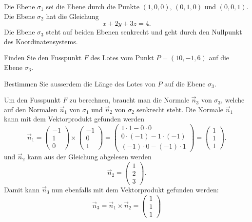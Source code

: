 Die Ebene $\sigma_1$ sei die Ebene durch die Punkte $(1,0,0)$,
$(0,1,0)$ und $(0,0,1)$.
Die Ebene $\sigma_2$ hat die Gleichung
\[
x+2y+3z=4.
\]
Die Ebene $\sigma_3$ steht auf beiden Ebenen senkrecht und geht
durch den Nullpunkt des Koordinatensystems.
\begin{teilaufgaben}
\item
Finden Sie den Fusspunkt $F$ des Lotes vom Punkt $P=(10,-1,6)$ auf die
Ebene $\sigma_3$.
\item
Bestimmen Sie ausserdem die Länge des Lotes von $P$ auf die Ebene $\sigma_3$.
\end{teilaufgaben}


\begin{loesung}
Um den Fusspunkt $F$ zu berechnen, braucht man die Normale 
$\vec n_3$ von $\sigma_3$, welche auf den Normalen
$\vec n_1$ von $\sigma_1$ und $\vec n_2$ von $\sigma_2$ senkrecht steht.
Die Normale $\vec n_1$ kann mit dem Vektorprodukt gefunden werden
\[
\vec n_1
=
\begin{pmatrix}-1\\1\\0\end{pmatrix}
\times
\begin{pmatrix}-1\\0\\1\end{pmatrix}
=
\begin{pmatrix}
1\cdot 1 - 0 \cdot 0 \\
0\cdot (-1) - 1 \cdot (-1)\\ 
(-1)\cdot 0 - (-1) \cdot 1
\end{pmatrix}
=
\begin{pmatrix}
1\\1\\1
\end{pmatrix}.
\]
und $\vec n_2$ kann aus der Gleichung abgelesen werden
\[
\vec n_2
=
\begin{pmatrix}
1\\2\\3
\end{pmatrix}.
\]
Damit kann $\vec n_3$ nun ebenfalls mit dem Vektorprodukt gefunden werden:
\[
\vec n_3
=
\vec n_1 \times \vec n_2
=
\begin{pmatrix}1\\1\\1\end{pmatrix}
\]
\end{loesung}
